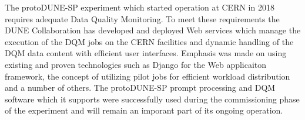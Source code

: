 \documentclass{webofc}
\newcommand{\pd}{protoDUNE\xspace}
\begin{document}
The \pd-SP experiment which started operation at CERN in 2018 requires adequate Data
Quality Monitoring. To meet these requirements the DUNE Collaboration has developed
and deployed Web services which manage the execution of the DQM jobs on the CERN
facilities and dynamic handling of the DQM data content with efficient user interfaces.
Emphasis was made on using existing and proven technologies such as Django
for the Web applicaiton framework, the concept of utilizing pilot jobs for
efficient workload distribution and a number of others. The \pd-SP prompt
processing and DQM software which it supports were successfully used during
the commissioning phase of the experiment and will remain an imporant part
of its ongoing operation.

%
% 
%
%
\end{document}

